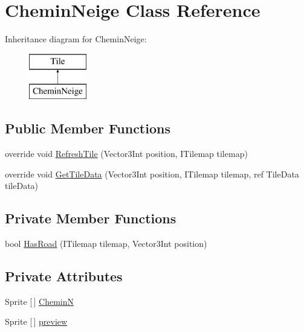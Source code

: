 \hypertarget{class_chemin_neige}{}\section{Chemin\+Neige Class Reference}
\label{class_chemin_neige}
Inheritance diagram for Chemin\+Neige\+:\begin{figure}[H]
\begin{center}
\leavevmode
\includegraphics[height=2.000000cm]{class_chemin_neige}
\end{center}
\end{figure}
\subsection*{Public Member Functions}
\begin{DoxyCompactItemize}
\item 
override void \mbox{\hyperlink{class_chemin_neige_accd4258086b766c710d5de5ad49b4eba}{Refresh\+Tile}} (Vector3\+Int position, I\+Tilemap tilemap)
\item 
override void \mbox{\hyperlink{class_chemin_neige_a01e906730aaebbc00adc64cf776be853}{Get\+Tile\+Data}} (Vector3\+Int position, I\+Tilemap tilemap, ref Tile\+Data tile\+Data)
\end{DoxyCompactItemize}
\subsection*{Private Member Functions}
\begin{DoxyCompactItemize}
\item 
bool \mbox{\hyperlink{class_chemin_neige_a5aafd7cc2981345075a2b20edd747fce}{Has\+Road}} (I\+Tilemap tilemap, Vector3\+Int position)
\end{DoxyCompactItemize}
\subsection*{Private Attributes}
\begin{DoxyCompactItemize}
\item 
Sprite \mbox{[}$\,$\mbox{]} \mbox{\hyperlink{class_chemin_neige_ae02bf65481eb3ca35e8a2b1744b007c3}{CheminN}}
\item 
Sprite \mbox{[}$\,$\mbox{]} \mbox{\hyperlink{class_chemin_neige_a6819770f9927f3a012ed332673330ddb}{preview}}
\end{DoxyCompactItemize}


